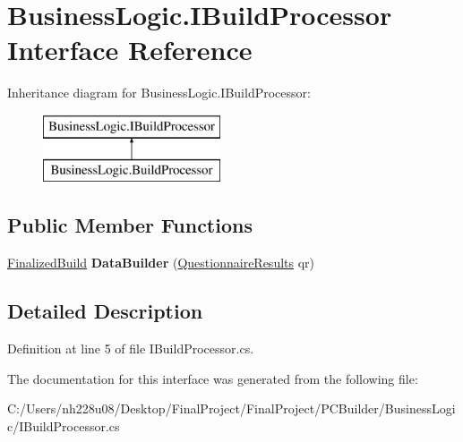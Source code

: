 \hypertarget{interface_business_logic_1_1_i_build_processor}{}\section{Business\+Logic.\+I\+Build\+Processor Interface Reference}
\label{interface_business_logic_1_1_i_build_processor}
Inheritance diagram for Business\+Logic.\+I\+Build\+Processor\+:\begin{figure}[H]
\begin{center}
\leavevmode
\includegraphics[height=2.000000cm]{interface_business_logic_1_1_i_build_processor}
\end{center}
\end{figure}
\subsection*{Public Member Functions}
\begin{DoxyCompactItemize}
\item 
\hyperlink{class_business_objects_1_1_finalized_build}{Finalized\+Build} {\bfseries Data\+Builder} (\hyperlink{class_business_objects_1_1_questionnaire_results}{Questionnaire\+Results} qr)\hypertarget{interface_business_logic_1_1_i_build_processor_a2e4fceb9979edca1ba6a37a45eb21608}{}\label{interface_business_logic_1_1_i_build_processor_a2e4fceb9979edca1ba6a37a45eb21608}

\end{DoxyCompactItemize}


\subsection{Detailed Description}


Definition at line 5 of file I\+Build\+Processor.\+cs.



The documentation for this interface was generated from the following file\+:\begin{DoxyCompactItemize}
\item 
C\+:/\+Users/nh228u08/\+Desktop/\+Final\+Project/\+Final\+Project/\+P\+C\+Builder/\+Business\+Logic/I\+Build\+Processor.\+cs\end{DoxyCompactItemize}
